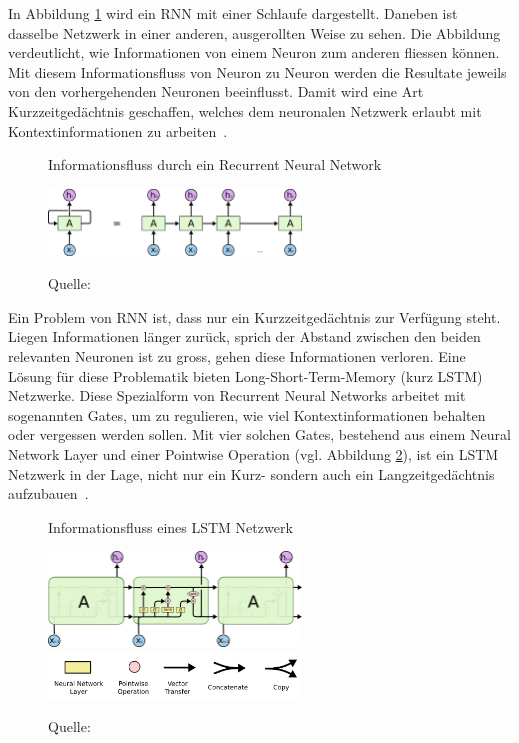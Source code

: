 In Abbildung \ref{rnn1} wird ein RNN mit einer Schlaufe dargestellt. Daneben ist dasselbe Netzwerk in einer anderen, ausgerollten Weise zu sehen. Die Abbildung verdeutlicht, wie Informationen von einem Neuron zum anderen fliessen können. Mit diesem Informationsfluss von Neuron zu Neuron werden die Resultate jeweils von den vorhergehenden Neuronen beeinflusst. Damit wird eine Art Kurzzeitgedächtnis geschaffen, welches dem neuronalen Netzwerk erlaubt mit Kontextinformationen zu arbeiten~\autocite{Olah2015}.
\begin{figure}[h!]
    \captionsetup{width=.9\linewidth}
    \caption{Informationsfluss durch ein Recurrent Neural Network}
    \label{rnn1}
    \centering
    \vspace{0.2cm}
    \includegraphics[width=0.6\textwidth]{graphics/rnn1.png}\\
    \vspace{0.3cm}
    \caption*{Quelle: \textcite{Olah2015}}
\end{figure}

Ein Problem von RNN ist, dass nur ein Kurzzeitgedächtnis zur Verfügung steht. Liegen Informationen länger zurück, sprich der Abstand zwischen den beiden relevanten Neuronen ist zu gross, gehen diese Informationen verloren. Eine Lösung für diese Problematik bieten Long-Short-Term-Memory (kurz LSTM) Netzwerke. Diese Spezialform von Recurrent Neural Networks arbeitet mit sogenannten Gates, um zu regulieren, wie viel Kontextinformationen behalten oder vergessen werden sollen. Mit vier solchen Gates, bestehend aus einem Neural Network Layer und einer Pointwise Operation (vgl. Abbildung \ref{lstm1}), ist ein LSTM Netzwerk in der Lage, nicht nur ein Kurz- sondern auch ein Langzeitgedächtnis aufzubauen~\autocite{Olah2015}.
\begin{figure}[h!]
    \captionsetup{width=.9\linewidth}
    \caption{Informationsfluss eines LSTM Netzwerk}
    \label{lstm1}
    \centering
    \includegraphics[width=0.6\textwidth]{graphics/lstm.png}\\
    \vspace{0.5cm}
    \includegraphics[width=0.6\textwidth]{graphics/lstm-notation.png}\\
    \vspace{0.1cm}
    \caption*{Quelle: \textcite{Olah2015}}
\end{figure}


